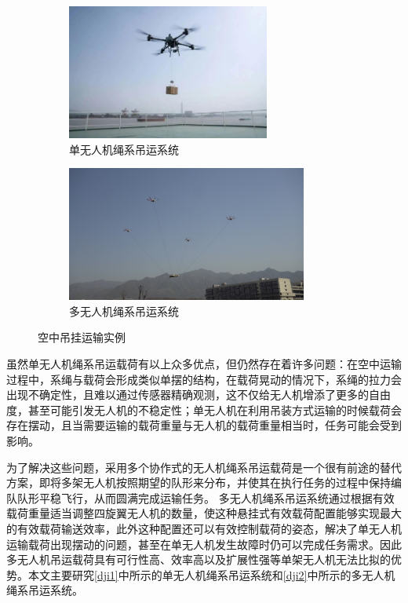 \documentclass[lang=chs, degree=master, blindreview=true, winfonts=true]{yanputhesis}
\begin{document}
\begin{figure}[htb!]
    \centering
	\hspace{-1.0cm}
    \begin{minipage}[t]{0.96\textwidth}
        \centering
        \begin{subfigure}[t]{0.47\textwidth}
            \centering
            \includegraphics[height = 1.75in]{picture/dji1.jpg}
            \caption{单无人机绳系吊运系统\label{dji1}}
        \end{subfigure}\hfill
        \begin{subfigure}[t]{0.47\textwidth}
            \centering
            \includegraphics[height = 1.75in]{picture/dji2.png}
            \caption{多无人机绳系吊运系统\label{dji2}}
        \end{subfigure}
    \end{minipage}
    \caption{空中吊挂运输实例}
\end{figure}

虽然单无人机绳系吊运载荷有以上众多优点，但仍然存在着许多问题：在空中运输过程中，系绳与载荷会形成类似单摆的结构，在载荷晃动的情况下，系绳的拉力会出现不确定性，且难以通过传感器精确观测，这不仅给无人机增添了更多的自由度，甚至可能引发无人机的不稳定性；单无人机在利用吊装方式运输的时候载荷会存在摆动，且当需要运输的载荷重量与无人机的载荷重量相当时，任务可能会受到影响。

为了解决这些问题，采用多个协作式的无人机绳系吊运载荷是一个很有前途的替代方案，即将多架无人机按照期望的队形来分布，并使其在执行任务的过程中保持编队队形平稳飞行，从而圆满完成运输任务。
多无人机绳系吊运系统通过根据有效载荷重量适当调整四旋翼无人机的数量，使这种悬挂式有效载荷配置能够实现最大的有效载荷输送效率，此外这种配置还可以有效控制载荷的姿态，解决了单无人机运输载荷出现摆动的问题，甚至在单无人机发生故障时仍可以完成任务需求。因此多无人机吊运载荷具有可行性高、效率高以及扩展性强等单架无人机无法比拟的优势。本文主要研究\autoref{dji1}中所示的单无人机绳系吊运系统和\autoref{dji2}中所示的多无人机绳系吊运系统。
\end{document}
